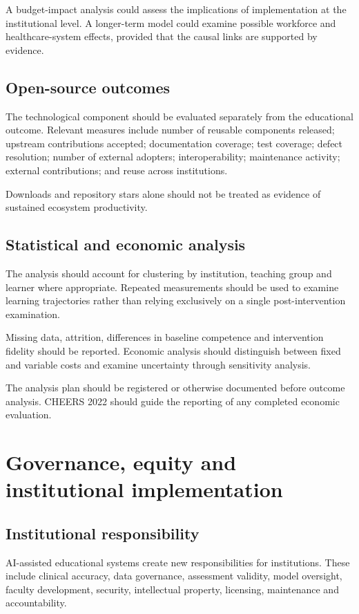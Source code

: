 \documentclass[11pt,a4paper]{article}
\begin{document}
A budget-impact analysis could assess the implications of implementation at the institutional level. A longer-term model could examine possible workforce and healthcare-system effects, provided that the causal links are supported by evidence.

\subsection{Open-source outcomes}
The technological component should be evaluated separately from the educational outcome. Relevant measures include number of reusable components released; upstream contributions accepted; documentation coverage; test coverage; defect resolution; number of external adopters; interoperability; maintenance activity; external contributions; and reuse across institutions.

Downloads and repository stars alone should not be treated as evidence of sustained ecosystem productivity.

\subsection{Statistical and economic analysis}
The analysis should account for clustering by institution, teaching group and learner where appropriate. Repeated measurements should be used to examine learning trajectories rather than relying exclusively on a single post-intervention examination.

Missing data, attrition, differences in baseline competence and intervention fidelity should be reported. Economic analysis should distinguish between fixed and variable costs and examine uncertainty through sensitivity analysis.

The analysis plan should be registered or otherwise documented before outcome analysis. CHEERS 2022 should guide the reporting of any completed economic evaluation.

\section{Governance, equity and institutional implementation}
\subsection{Institutional responsibility}
AI-assisted educational systems create new responsibilities for institutions. These include clinical accuracy, data governance, assessment validity, model oversight, faculty development, security, intellectual property, licensing, maintenance and accountability.
\end{document}
